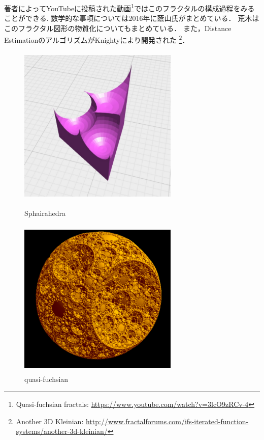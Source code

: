 著者によってYouTubeに投稿された動画\footnote{Quasi-fuchsian fractals: \url{https://www.youtube.com/watch?v=3lcO9zRCv-4}}ではこのフラクタルの構成過程をみることができる.
数学的な事項については2016年に蔭山氏がまとめている\cite{kageyama}．
荒木はこのフラクタル図形の物質化についてもまとめている\cite{materializing}．
また，Distance EstimationのアルゴリズムがKnightyにより開発された
\footnote{Another 3D Kleinian:
 \url{http://www.fractalforums.com/ifs-iterated-function-systems/another-3d-kleinian/}}．

\begin{figure}[htbp]
 \begin{minipage}{0.49\hsize}
  \begin{center}
   \includegraphics[width=3in, height=3in, keepaspectratio]{../img/klein/sphairahedra.pdf}
   \caption{Sphairahedra}
   \label{fig:sphairahedra}
  \end{center}
 \end{minipage}
 \begin{minipage}{0.49\hsize}
  \begin{center}
   \includegraphics[width=3in, height=3in, keepaspectratio]{../img/klein/quasi-fuchsian.pdf}
   \caption{quasi-fuchsian}
   \label{fig:quasiFuchsian}
  \end{center}
 \end{minipage}
\end{figure}

